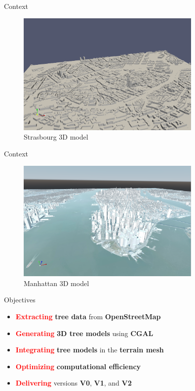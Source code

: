\documentclass[10pt]{beamer}
\begin{document}
\begin{frame}{Context}
  \Large
\begin{figure}[H]
  \centering
  \includegraphics[width=0.8\textwidth]{images/stras_mesh.png}
  \caption{Strasbourg 3D model}
\end{figure}
\end{frame}

\begin{frame}{Context}
  \Large
\begin{figure}[H]
  \centering
  \includegraphics[width=0.8\textwidth]{images/manhattan_mesh.png}
  \caption{Manhattan 3D model}
\end{figure}
\end{frame}

\begin{frame}{Objectives}
  \Large
  \begin{itemize}
      \item \textbf{\textcolor{red}{Extracting}} \textbf{tree data} from \textbf{OpenStreetMap}
      \item \textbf{\textcolor{red}{Generating}} \textbf{3D tree models} using \textbf{CGAL}
      \item \textbf{\textcolor{red}{Integrating}} \textbf{tree models} in the \textbf{terrain mesh}
      \item \textbf{\textcolor{red}{Optimizing}} \textbf{computational efficiency}
      \item \textbf{\textcolor{red}{Delivering}} versions \textbf{V0}, \textbf{V1}, and \textbf{V2}
  \end{itemize}
\end{frame}
\end{document}
